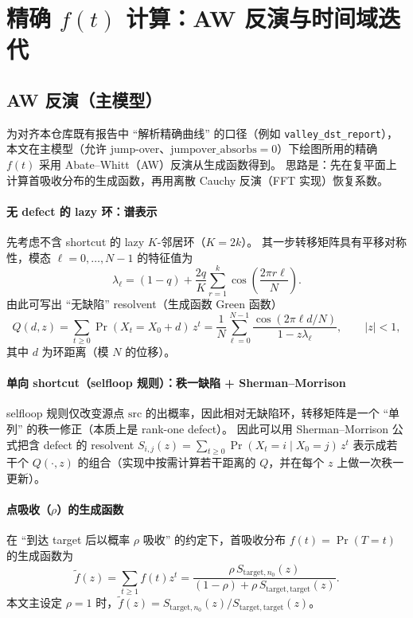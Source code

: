 \documentclass[11pt,fontset=fandol]{ctexart}
\begin{document}
\section{精确 $f(t)$ 计算：AW 反演与时间域迭代}
\subsection{AW 反演（主模型）}
为对齐本仓库既有报告中 ``解析精确曲线'' 的口径（例如 \texttt{valley\_dst\_report}），
本文在主模型（允许 jump-over、$\mathrm{jumpover\_absorbs}=0$）下绘图所用的精确 $f(t)$ 采用 Abate--Whitt（AW）反演从生成函数得到。
思路是：先在复平面上计算首吸收分布的生成函数，再用离散 Cauchy 反演（FFT 实现）恢复系数。

\paragraph{无 defect 的 lazy 环：谱表示}
先考虑不含 shortcut 的 lazy $K$-邻居环（$K=2k$）。
其一步转移矩阵具有平移对称性，模态 $\ell=0,\dots,N-1$ 的特征值为
\[
\lambda_\ell=(1-q)+\frac{2q}{K}\sum_{r=1}^{k}\cos\!\left(\frac{2\pi r\ell}{N}\right).
\]
由此可写出 ``无缺陷'' resolvent（生成函数 Green 函数）
\[
Q(d,z)=\sum_{t\ge0}\Pr(X_t=X_0+d)\,z^t
=\frac{1}{N}\sum_{\ell=0}^{N-1}\frac{\cos(2\pi \ell d/N)}{1-z\lambda_\ell},
\qquad |z|<1,
\]
其中 $d$ 为环距离（模 $N$ 的位移）。

\paragraph{单向 shortcut（selfloop 规则）：秩一缺陷 + Sherman--Morrison}
selfloop 规则仅改变源点 $\mathrm{src}$ 的出概率，因此相对无缺陷环，转移矩阵是一个 ``单列'' 的秩一修正（本质上是 rank-one defect）。
因此可以用 Sherman--Morrison 公式把含 defect 的 resolvent
$S_{i,j}(z)=\sum_{t\ge0}\Pr(X_t=i\mid X_0=j)\,z^t$
表示成若干个 $Q(\cdot,z)$ 的组合（实现中按需计算若干距离的 $Q$，并在每个 $z$ 上做一次秩一更新）。

\paragraph{点吸收（$\rho$）的生成函数}
在 ``到达 target 后以概率 $\rho$ 吸收'' 的约定下，首吸收分布 $f(t)=\Pr(T=t)$ 的生成函数为
\[
\tilde f(z)=\sum_{t\ge1}f(t)z^t
=\frac{\rho\,S_{\mathrm{target},n_0}(z)}{(1-\rho)+\rho\,S_{\mathrm{target},\mathrm{target}}(z)}.
\]
本文主设定 $\rho=1$ 时，$\tilde f(z)=S_{\mathrm{target},n_0}(z)/S_{\mathrm{target},\mathrm{target}}(z)$。
\end{document}
